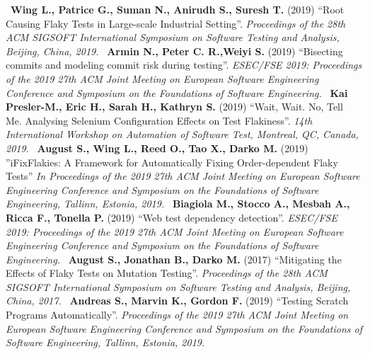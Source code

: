 \newline~\newline
[S17] \textbf{Wing L., Patrice G., Suman N., Anirudh S., Suresh T.} (2019) “Root Causing Flaky Tests in Large-scale Industrial Setting”. \emph{Proceedings of the 28th ACM SIGSOFT International Symposium on Software Testing and Analysis, Beijing, China, 2019.}
\newline~\newline
[S18] \textbf{Armin N., Peter C. R.,Weiyi S.} (2019) “Bisecting commits and modeling commit risk during testing”. \emph{ESEC/FSE 2019: Proceedings of the 2019 27th ACM Joint Meeting on European Software Engineering Conference and Symposium on the Foundations of Software Engineering.}
\newline~\newline
[S19] \textbf{Kai Presler-M., Eric H., Sarah H., Kathryn S.} (2019) “Wait, Wait. No, Tell Me. Analysing Selenium Configuration Effects on Test Flakiness”. \emph{14th International Workshop on Automation of Software Test, Montreal, QC, Canada, 2019.}
\newline~\newline
[S20] \textbf{August S., Wing L., Reed O., Tao X., Darko M.} (2019) ”iFixFlakies: A Framework for Automatically Fixing Order-dependent Flaky Tests” \emph{In Proceedings of the 2019 27th ACM Joint Meeting on European Software Engineering Conference and Symposium on the Foundations of Software Engineering, Tallinn, Estonia, 2019.}
\newline~\newline
[S21] \textbf{Biagiola M., Stocco A., Mesbah A., Ricca F., Tonella P.} (2019) “Web test dependency detection”. \emph{ESEC/FSE 2019: Proceedings of the 2019 27th ACM Joint Meeting on European Software Engineering Conference and Symposium on the Foundations of Software Engineering.}
\newline~\newline
[S22] \textbf{August S., Jonathan B., Darko M.} (2017) “Mitigating the Effects of Flaky Tests on Mutation Testing”. \emph{Proceedings of the 28th ACM SIGSOFT International Symposium on Software Testing and Analysis, Beijing, China, 2017.}
\newline~\newline
[S23] \textbf{Andreas S., Marvin K., Gordon F.} (2019) “Testing Scratch Programs Automatically”. \emph{Proceedings of the 2019 27th ACM Joint Meeting on European Software Engineering Conference and Symposium on the Foundations of Software Engineering, Tallinn, Estonia, 2019.}
